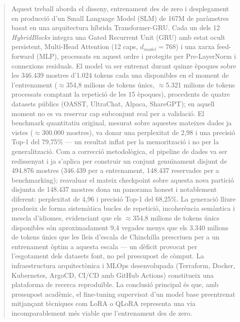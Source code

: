 \vspace*{\fill}
\begin{abstract}
    Aquest treball aborda el disseny, entrenament des de zero i desplegament en producció d'un Small Language Model (SLM) de 167M de paràmetres basat en una arquitectura híbrida Transformer-GRU. Cada un dels 12 \textit{HybridBlocks} integra una Gated Recurrent Unit (GRU) amb estat ocult persistent, Multi-Head Attention (12 caps, $d_{model}=768$) i una xarxa feed-forward (MLP), processats en aquest ordre i protegits per Pre-LayerNorm i connexions residuals. El model va ser entrenat durant quinze èpoques sobre les 346.439 mostres d'1.024 tokens cada una disponibles en el moment de l'entrenament ($\approx$354,8 milions de tokens únics, $\approx$5.321 milions de tokens processats comptant la repetició de les 15 èpoques), procedents de quatre datasets públics (OASST, UltraChat, Alpaca, ShareGPT); en aquell moment no es va reservar cap subconjunt real per a validació. El benchmark quantitatiu original, mesurat sobre aquestes mateixes dades ja vistes ($\approx$300.000 mostres), va donar una perplexitat de 2,98 i una precisió Top-1 del 79,75\% --- un resultat inflat per la memorització i no per la generalització. Com a correcció metodològica, el pipeline de dades va ser redissenyat i ja s'aplica per construir un conjunt genuïnament disjunt de 494.876 mostres (346.439 per a entrenament, 148.437 reservades per a benchmarking); reavaluar el mateix checkpoint sobre aquesta nova partició disjunta de 148.437 mostres dona un panorama honest i notablement diferent: perplexitat de 4,96 i precisió Top-1 del 68,25\%. La generació lliure produeix de forma sistemàtica bucles de repetició, incoherència semàntica i mescla d'idiomes, evidenciant que els $\approx$354,8 milions de tokens únics disponibles són aproximadament 9,4 vegades menys que els 3.340 milions de tokens únics que les lleis d'escala de Chinchilla prescriuen per a un entrenament òptim a aquesta escala --- un dèficit provocat per l'esgotament dels datasets font, no pel pressupost de còmput. La infraestructura arquitectònica i MLOps desenvolupada (Terraform, Docker, Kubernetes, ArgoCD, CI/CD amb GitHub Actions) constitueix una plataforma de recerca reproduïble. La conclusió principal és que, amb pressupost acadèmic, el fine-tuning supervisat d'un model base preentrenat mitjançant tècniques com LoRA o QLoRA representa una via incomparablement més viable que l'entrenament des de zero.
\end{abstract}
\vspace*{\fill}
\clearpage
